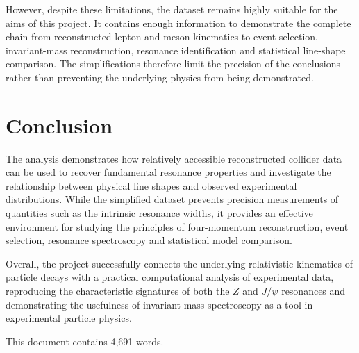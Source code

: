 \documentclass[11pt, a4paper]{article}
\newcommand{\totalwords}{4,691} %
\numberwithin{equation}{section}
\begin{document}
However, despite these limitations, the dataset remains highly suitable for the aims of this project. It contains enough information to demonstrate the complete chain from reconstructed lepton and meson kinematics to event selection, invariant-mass reconstruction, resonance identification and statistical line-shape comparison. The simplifications therefore limit the precision of the conclusions rather than preventing the underlying physics from being demonstrated.

\section{Conclusion}

The analysis demonstrates how relatively accessible reconstructed collider data can be used to recover fundamental resonance properties and investigate the relationship between physical line shapes and observed experimental distributions. While the simplified dataset prevents precision measurements of quantities such as the intrinsic resonance widths, it provides an effective environment for studying the principles of four-momentum reconstruction, event selection, resonance spectroscopy and statistical model comparison.

Overall, the project successfully connects the underlying relativistic kinematics of particle decays with a practical computational analysis of experimental data, reproducing the characteristic signatures of both the $Z$ and $J/\psi$ resonances and demonstrating the usefulness of invariant-mass spectroscopy as a tool in experimental particle physics.




This document contains \totalwords{} words.
\end{document}
